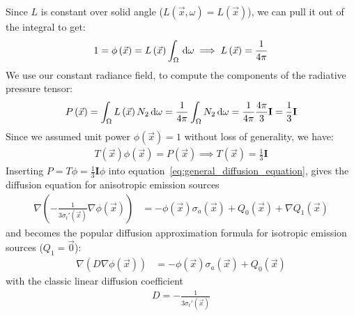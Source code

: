 Since $L$ is constant over solid angle ($L(\vec{x}, \omega)=L(\vec{x})$), we can pull it out of the integral to get:
\begin{align*}
1 = \phi\left(\vec{x}\right) = L\left(\vec{x}\right)\int_\Omega{\,\mathrm{d}\omega}\implies L\left(\vec{x}\right) = \frac{1}{4\pi}
\end{align*}
We use our constant radiance field, to compute the components of the radiative pressure tensor:
\begin{align*}
P\left(\vec{x}\right) 
= \int_\Omega{L\left(\vec{x}\right)N_2\,\mathrm{d}\omega}
= \frac{1}{4\pi}\int_\Omega{N_2\,\mathrm{d}\omega}
= \frac{1}{4\pi}\frac{4\pi}{3}\mathbf{I}
= \frac{1}{3}\mathbf{I}
\end{align*}
Since we assumed unit power $\phi(\vec{x})=1$ without loss of generality, we have:
\begin{align*}
T(\vec{x})\phi(\vec{x}) = P(\vec{x}) \implies T(\vec{x})=\frac{1}{3}\mathbf{I}
\end{align*}
Inserting $P=T\phi=\frac{1}{3}\mathbf{I}\phi$ into equation~\ref{eq:general_diffusion_equation}, gives the diffusion equation for anisotropic emission sources
\begin{align}
\label{eq:diffusion_equation_anisotropic_Q}
\nabla
\left(
-\frac{1}{3\sigma_t'\left(\vec{x}\right)}
\nabla \phi\left(\vec{x}\right)
\right)&=
-\phi(\vec{x})\sigma_a(\vec{x})
+Q_0\left(\vec{x}\right)
+\nabla Q_1\left(\vec{x}\right)
\end{align}
and becomes the popular diffusion approximation formula for isotropic emission sources ($Q_1=\vec{0}$):
\begin{align}
\label{eq:diffusion_equation_anisotropic_Q}
\nabla
\left(
D
\nabla \phi\left(\vec{x}\right)
\right)&=
-\phi(\vec{x})\sigma_a(\vec{x})
+Q_0\left(\vec{x}\right)
\end{align}
with the classic linear diffusion coefficient
\begin{align}
D=-\frac{1}{3\sigma_t'\left(\vec{x}\right)}
\end{align}


